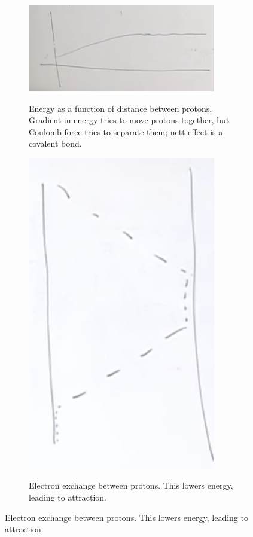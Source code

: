 \documentclass[]{article}
\begin{document}
\begin{figure}[H]
\begin{subfigure}{0.45\textwidth}
		\caption{Energy as a function of distance between protons. Gradient in energy tries to move protons together, but Coulomb force tries to separate them; nett effect is a covalent bond.}
		\includegraphics[width=0.9\textwidth]{2proton1ElectronEnergy}\label{fig:2proton1ElectronEnergy}
	\end{subfigure}
	\begin{subfigure}{0.45\textwidth}
		\caption{Electron exchange between protons. This lowers energy, leading to attraction.}
		\includegraphics[width=0.9\textwidth]{2proton1ElectronHopping}\label{fig:2proton1ElectronHopping}
	\end{subfigure}
\end{figure}
\end{document}

